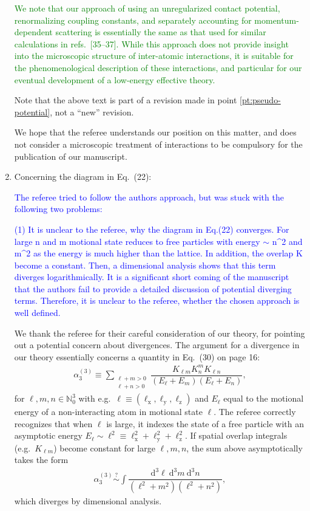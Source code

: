 \documentclass[preprint]{revtex4-1}
\newcommand{\f}{\dfrac} %
\newcommand{\p}[1]{\left(#1\right)} %
\renewcommand{\d}{\text{d}}
\newcommand{\x}{\text{x}}
\newcommand{\y}{\text{y}}
\newcommand{\z}{\text{z}}
\newcommand{\1}{\mathds{1}}
\newcommand{\blue}[1]{\textcolor{blue}{#1}}
\newcommand{\green}[1]{\textcolor{green}{#1}}
\begin{document}
\begin{enumerate}
  \green{We note that our approach of using an unregularized contact
    potential, renormalizing coupling constants, and separately
    accounting for momentum-dependent scattering is essentially the
    same as that used for similar calculations in refs.~[35--37].
    While this approach does not provide insight into the microscopic
    structure of inter-atomic interactions, it is suitable for the
    phenomenological description of these interactions, and particular
    for our eventual development of a low-energy effective theory.}

  Note that the above text is part of a revision made in point
  \ref{pt:pseudo-potential}, not a ``new'' revision.

  We hope that the referee understands our position on this matter,
  and does not consider a microscopic treatment of interactions to be
  compulsory for the publication of our manuscript.


\item Concerning the diagram in Eq.~(22):

  \blue{The referee tried to follow the authors approach, but was
    stuck with the following two problems:}

  \blue{(1) It is unclear to the referee, why the diagram in Eq.(22)
    converges. For large n and m motional state reduces to free
    particles with energy $\sim$ n\^{}2 and m\^{}2 as the energy is
    much higher than the lattice. In addition, the overlap K become a
    constant. Then, a dimensional analysis shows that this term
    diverges logarithmically. It is a significant short coming of the
    manuscript that the authors fail to provide a detailed discussion
    of potential diverging terms. Therefore, it is unclear to the
    referee, whether the chosen approach is well defined.}

  \label{pt:divergence}

  We thank the referee for their careful consideration of our theory,
  for pointing out a potential concern about divergences.  The
  argument for a divergence in our theory essentially concerns a
  quantity in Eq.~(30) on page 16:
  \begin{align*}
    \alpha_3^{(3)} \equiv \sum_{\substack{\ell+m>0\\\ell+n>0}}
    \f{K_{\ell m} K^m_n K_{\ell n}}{\p{E_\ell+E_m}\p{E_\ell+E_n}},
  \end{align*}
  for $\ell,m,n\in\mathbb{N}_0^3$ with
  e.g.~$\ell\equiv\p{\ell_\x,\ell_\y,\ell_\z}$ and $E_\ell$ equal to
  the motional energy of a non-interacting atom in motional state
  $\ell$.  The referee correctly recognizes that when $\ell$ is large,
  it indexes the state of a free particle with an asymptotic energy
  $E_\ell\sim\ell^2\equiv\ell_\x^2+\ell_\y^2+\ell_\z^2$.  If spatial
  overlap integrals (e.g.~$K_{\ell m}$) become constant for large
  $\ell,m,n$, the sum above asymptotically takes the form
  \begin{align*}
    \alpha_3^{(3)} \stackrel{?}{\sim}
    \int \f{\d^3\ell~\d^3m~\d^3n}{\p{\ell^2+m^2}\p{\ell^2+n^2}},
  \end{align*}
  which diverges by dimensional analysis.


\end{enumerate}
\end{document}
